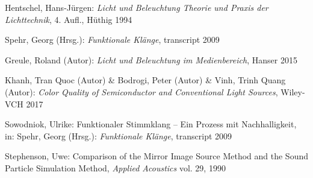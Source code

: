 \begin{thebibliography}{}
Hentschel, Hans-Jürgen: 
\emph{Licht und Beleuchtung Theorie und Praxis der Lichttechnik}, 4. Aufl., Hüthig 1994

Spehr, Georg (Hrsg.): 
\emph{Funktionale Klänge}, transcript 2009

Greule, Roland (Autor):
\emph{Licht und Beleuchtung im Medienbereich}, Hanser 2015 

Khanh, Tran Quoc (Autor) \& Bodrogi, Peter (Autor) \& Vinh, Trinh Quang (Autor):
\emph{Color Quality of Semiconductor and Conventional Light Sources}, Wiley-VCH 2017


Sowodniok, Ulrike: 
\glqq Funktionaler Stimmklang -- Ein Prozess mit Nachhalligkeit\grqq, 
in: Spehr, Georg (Hrsg.): \emph{Funktionale Klänge}, transcript 2009




Stephenson, Uwe: 
\glqq Comparison of the Mirror Image Source Method and the Sound Particle Simulation Method\grqq, 
\emph{Applied Acoustics} vol. 29, 1990


\end{thebibliography}

\clearpage\thispagestyle{empty}
\eigen  %












